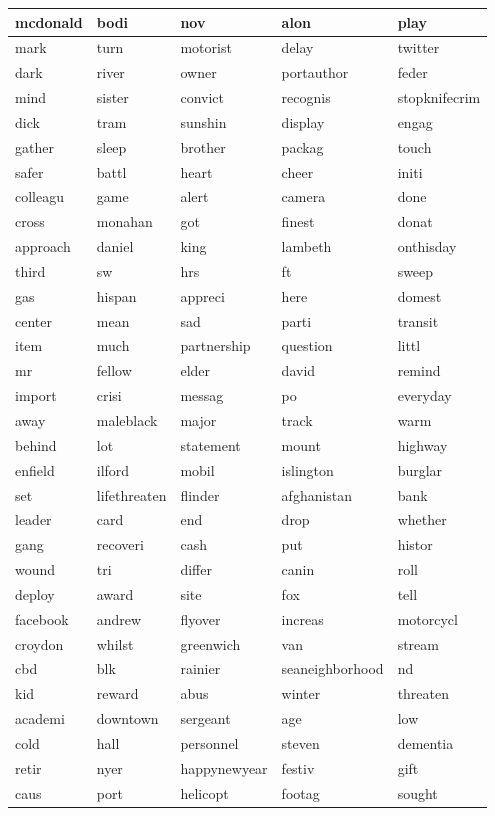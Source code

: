 \begin{longtable}{p{2.5cm}p{2.5cm}p{2.5cm}p{2.5cm}p{2.5cm}}
mcdonald&bodi&nov&alon&play\\ \hline 
mark&turn&motorist&delay&twitter\\ \hline 
dark&river&owner&portauthor&feder\\ \hline 
mind&sister&convict&recognis&stopknifecrim\\ \hline 
dick&tram&sunshin&display&engag\\ \hline 
gather&sleep&brother&packag&touch\\ \hline 
safer&battl&heart&cheer&initi\\ \hline 
colleagu&game&alert&camera&done\\ \hline 
cross&monahan&got&finest&donat\\ \hline 
approach&daniel&king&lambeth&onthisday\\ \hline 
third&sw&hrs&ft&sweep\\ \hline 
gas&hispan&appreci&here&domest\\ \hline 
center&mean&sad&parti&transit\\ \hline 
item&much&partnership&question&littl\\ \hline 
mr&fellow&elder&david&remind\\ \hline 
import&crisi&messag&po&everyday\\ \hline 
away&maleblack&major&track&warm\\ \hline 
behind&lot&statement&mount&highway\\ \hline 
enfield&ilford&mobil&islington&burglar\\ \hline 
set&lifethreaten&flinder&afghanistan&bank\\ \hline 
leader&card&end&drop&whether\\ \hline 
gang&recoveri&cash&put&histor\\ \hline 
wound&tri&differ&canin&roll\\ \hline 
deploy&award&site&fox&tell\\ \hline 
facebook&andrew&flyover&increas&motorcycl\\ \hline 
croydon&whilst&greenwich&van&stream\\ \hline 
cbd&blk&rainier&seaneighborhood&nd\\ \hline 
kid&reward&abus&winter&threaten\\ \hline 
academi&downtown&sergeant&age&low\\ \hline 
cold&hall&personnel&steven&dementia\\ \hline 
retir&nyer&happynewyear&festiv&gift\\ \hline 
caus&port&helicopt&footag&sought\\ \hline 

\end{longtable}
